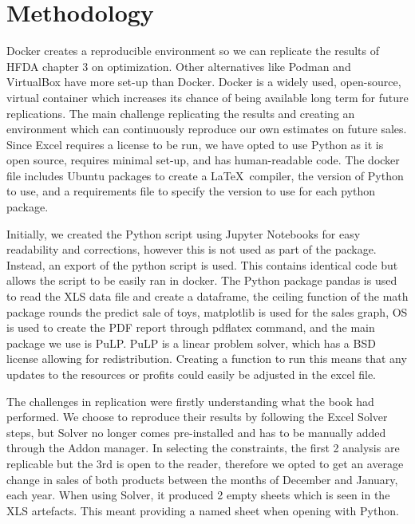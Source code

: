 \documentclass[acmtog]{acmart}
\begin{document}
\section{Methodology}
Docker creates a reproducible environment so we can replicate the results of HFDA chapter 3 on optimization. Other alternatives like Podman and VirtualBox have more set-up than Docker. Docker is a widely used, open-source, virtual container which increases its chance of being available long term for future replications. The main challenge replicating the results and creating an environment which can continuously reproduce our own estimates on future sales. Since Excel requires a license to be run, we have opted to use Python as it is open source, requires minimal set-up, and has human-readable code. The docker file includes Ubuntu packages to create a \LaTeX\ compiler, the version of Python to use, and a requirements file to specify the version to use for each python package.

Initially, we created the Python script using Jupyter Notebooks for easy readability and corrections, however this is not used as part of the package. Instead, an export of the python script is used. This contains identical code but allows the script to be easily ran in docker. The Python package pandas is used to read the XLS data file and create a dataframe, the ceiling function of the math package rounds the predict sale of toys, matplotlib is used for the sales graph, OS is used to create the PDF report through pdflatex command, and the main package we use is PuLP. PuLP is a linear problem solver, which has a BSD license allowing for redistribution. Creating a function to run this means that any updates to the resources or profits could easily be adjusted in the excel file.

The challenges in replication were firstly understanding what the book had performed. We choose to reproduce their results by following the Excel Solver steps, but Solver no longer comes pre-installed and has to be manually added through the Addon manager. In selecting the constraints, the first 2 analysis are replicable but the 3rd is open to the reader, therefore we opted to get an average change in sales of both products between the months of December and January, each year. When using Solver, it produced 2 empty sheets which is seen in the XLS artefacts. This meant providing a named sheet when opening with Python. 
\end{document}
